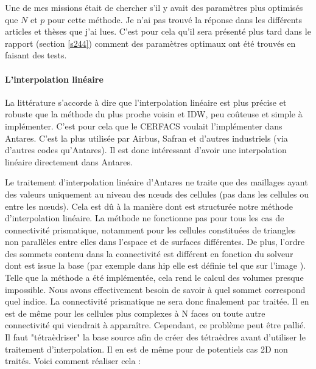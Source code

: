 Une de mes missions était de chercher s'il y avait des paramètres plus optimisés que \(N\) et \(p\) pour cette méthode. Je n'ai pas trouvé la réponse dans les différents articles \cite{idw-arcgis} et thèses que j'ai lues. C'est pour cela qu'il sera présenté plus tard dans le rapport (section \ref{s244}) comment des paramètres optimaux ont été trouvés en faisant des tests.

\label{prisme}\paragraph{L'interpolation linéaire}

La littérature \cite{fluidssengineer, palmer2009} s'accorde à dire que l'interpolation linéaire est plus précise et robuste que la méthode du plus proche voisin et IDW, peu coûteuse et simple à implémenter. C'est pour cela que le CERFACS voulait l'implémenter dans Antares. C'est la plus utilisée par Airbus, Safran et d'autres industriels (via d'autres codes qu'Antares). Il est donc intéressant d'avoir une interpolation linéaire directement dans Antares.

Le traitement d'interpolation linéaire d'Antares ne traite que des maillages ayant des valeurs uniquement au niveau des nœuds des cellules (pas dans les cellules ou entre les nœuds). Cela est dû à la manière dont est structurée notre méthode d'interpolation linéaire. %
La méthode ne fonctionne pas pour tous les cas de connectivité prismatique, notamment pour les cellules constituées de triangles non parallèles entre elles dans l'espace et de surfaces différentes. De plus, l'ordre des sommets contenu dans la connectivité est différent en fonction du solveur dont est issue la base (par exemple dans hip elle est définie tel que sur l'image ). Telle que la méthode a été implémentée, cela rend le calcul des volumes presque impossible. Nous avons effectivement besoin de savoir à quel sommet correspond quel indice. La connectivité prismatique ne sera donc finalement par traitée. Il en est de même pour les cellules plus complexes à N faces ou toute autre connectivité qui viendrait à apparaître.
Cependant, ce problème peut être pallié. Il faut "tétraèdriser" la base source afin de créer des tétraèdres avant d'utiliser le traitement d'interpolation. Il en est de même pour de potentiels cas 2D non traités.
Voici comment réaliser cela :

